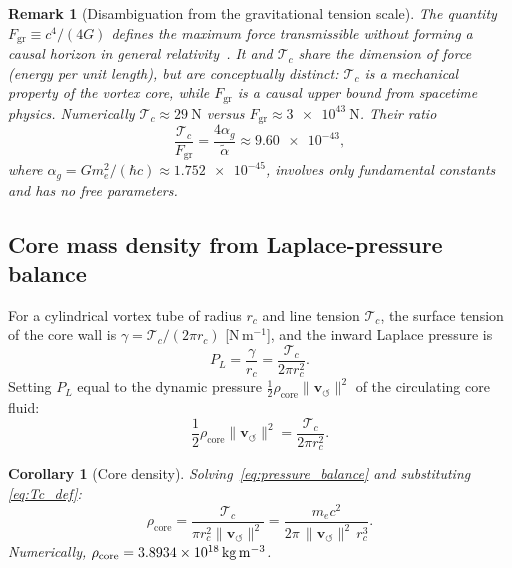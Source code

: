 \documentclass[aps,pra,preprint,longbibliography,nofootinbib]{revtex4-2}
\newtheorem{corollary}{Corollary}
\newtheorem{remark}{Remark}
\newcommand{\vnorm}{\lVert\mathbf{v}_{\!\boldsymbol{\circlearrowleft}}\rVert} %
\newcommand{\rhocore}{\rho_{\mathrm{core}}}      %
\newcommand{\rc}{r_c}                            %
\newcommand{\Tc}{\mathcal{T}_c}                  %
\newcommand{\Fgr}{F_{\mathrm{gr}}}              %
\begin{document}
\begin{remark}[Disambiguation from the gravitational tension scale]
\label{rem:Fgr}
The quantity $\Fgr \equiv c^4/(4G)$ defines the maximum force
transmissible without forming a causal horizon in general
relativity~\cite{Gibbons2002,Schiller2006}.
It and $\Tc$ share the dimension of force (energy per unit length),
but are conceptually distinct:
$\Tc$ is a mechanical property of the vortex core, while $\Fgr$ is
a causal upper bound from spacetime physics.
Numerically $\Tc \approx \SI{29}{\newton}$ versus
$\Fgr \approx \SI{3e43}{\newton}$.
Their ratio
\begin{equation}
  \frac{\Tc}{\Fgr} = \frac{4\alpha_g}{\tilde\alpha}
                   \approx \num{9.60e-43},
  \label{eq:tension_ratio}
\end{equation}
where $\alpha_g = Gm_e^2/(\hbar c) \approx \num{1.752e-45}$,
involves only fundamental constants and has no free parameters.
\end{remark}

\subsection{Core mass density from Laplace-pressure balance}
\label{sec:rhocore}

For a cylindrical vortex tube of radius $\rc$ and line tension
$\Tc$, the surface tension of the core wall is
$\gamma = \Tc/(2\pi\rc)$ [N\,m$^{-1}$], and the inward Laplace
pressure is~\cite{Saffman1992,Donnelly1991}
\begin{equation}
  P_L = \frac{\gamma}{\rc} = \frac{\Tc}{2\pi\rc^2}.
  \label{eq:Laplace}
\end{equation}
Setting $P_L$ equal to the dynamic pressure $\tfrac{1}{2}\rhocore\vnorm^2$
of the circulating core fluid:
\begin{equation}
  \frac{1}{2}\rhocore\vnorm^2 = \frac{\Tc}{2\pi\rc^2}.
  \label{eq:pressure_balance}
\end{equation}

\begin{corollary}[Core density]
\label{cor:rho}
Solving~\eqref{eq:pressure_balance} and substituting
\eqref{eq:Tc_def}:
\begin{equation}
  \boxed{
    \rhocore = \frac{\Tc}{\pi\rc^2\vnorm^2}
             = \frac{m_e c^2}{2\pi\,\vnorm^2\,\rc^3}.
  }
  \label{eq:rhocore}
\end{equation}
Numerically, $\rhocore = \SI{3.893\,4e18}{\kilogram\per\cubic\meter}$.
\end{corollary}
\end{document}
